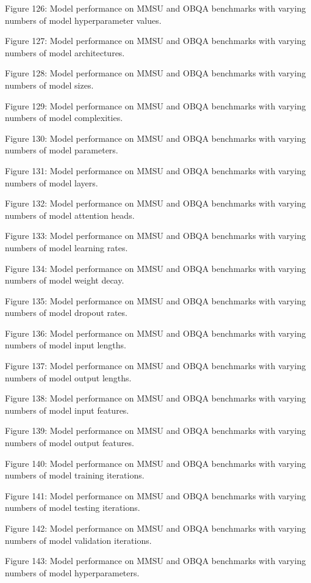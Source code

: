         Figure 126: Model performance on MMSU and OBQA benchmarks with varying numbers of model hyperparameter values.

        Figure 127: Model performance on MMSU and OBQA benchmarks with varying numbers of model architectures.

        Figure 128: Model performance on MMSU and OBQA benchmarks with varying numbers of model sizes.

        Figure 129: Model performance on MMSU and OBQA benchmarks with varying numbers of model complexities.

        Figure 130: Model performance on MMSU and OBQA benchmarks with varying numbers of model parameters.

        Figure 131: Model performance on MMSU and OBQA benchmarks with varying numbers of model layers.

        Figure 132: Model performance on MMSU and OBQA benchmarks with varying numbers of model attention heads.

        Figure 133: Model performance on MMSU and OBQA benchmarks with varying numbers of model learning rates.

        Figure 134: Model performance on MMSU and OBQA benchmarks with varying numbers of model weight decay.

        Figure 135: Model performance on MMSU and OBQA benchmarks with varying numbers of model dropout rates.

        Figure 136: Model performance on MMSU and OBQA benchmarks with varying numbers of model input lengths.

        Figure 137: Model performance on MMSU and OBQA benchmarks with varying numbers of model output lengths.

        Figure 138: Model performance on MMSU and OBQA benchmarks with varying numbers of model input features.

        Figure 139: Model performance on MMSU and OBQA benchmarks with varying numbers of model output features.

        Figure 140: Model performance on MMSU and OBQA benchmarks with varying numbers of model training iterations.

        Figure 141: Model performance on MMSU and OBQA benchmarks with varying numbers of model testing iterations.

        Figure 142: Model performance on MMSU and OBQA benchmarks with varying numbers of model validation iterations.

        Figure 143: Model performance on MMSU and OBQA benchmarks with varying numbers of model hyperparameters.

